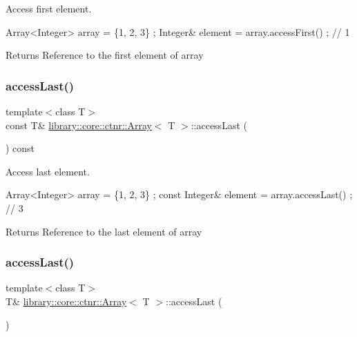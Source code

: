 Access first element. 


\begin{DoxyCode}
Array<Integer> array = \{1, 2, 3\} ;
Integer& element = array.accessFirst() ; \textcolor{comment}{// 1}
\end{DoxyCode}


\begin{DoxyReturn}{Returns}
Reference to the first element of array 
\end{DoxyReturn}
\mbox{\label{classlibrary_1_1core_1_1ctnr_1_1_array_ad95dcce8ddaf163903a2327f766dbc8a}} 
\subsubsection{\texorpdfstring{access\+Last()}{accessLast()}\hspace{0.1cm}{\footnotesize\ttfamily [1/2]}}
{\footnotesize\ttfamily template$<$class T$>$ \\
const T\& \hyperlink{classlibrary_1_1core_1_1ctnr_1_1_array}{library\+::core\+::ctnr\+::\+Array}$<$ T $>$\+::access\+Last (\begin{DoxyParamCaption}{ }\end{DoxyParamCaption}) const}



Access last element. 


\begin{DoxyCode}
Array<Integer> array = \{1, 2, 3\} ;
\textcolor{keyword}{const} Integer& element = array.accessLast() ; \textcolor{comment}{// 3}
\end{DoxyCode}


\begin{DoxyReturn}{Returns}
Reference to the last element of array 
\end{DoxyReturn}
\mbox{\label{classlibrary_1_1core_1_1ctnr_1_1_array_ad6ea47ab09dfeebd6de0878d3ad2de25}} 
\subsubsection{\texorpdfstring{access\+Last()}{accessLast()}\hspace{0.1cm}{\footnotesize\ttfamily [2/2]}}
{\footnotesize\ttfamily template$<$class T$>$ \\
T\& \hyperlink{classlibrary_1_1core_1_1ctnr_1_1_array}{library\+::core\+::ctnr\+::\+Array}$<$ T $>$\+::access\+Last (\begin{DoxyParamCaption}{ }\end{DoxyParamCaption})}



